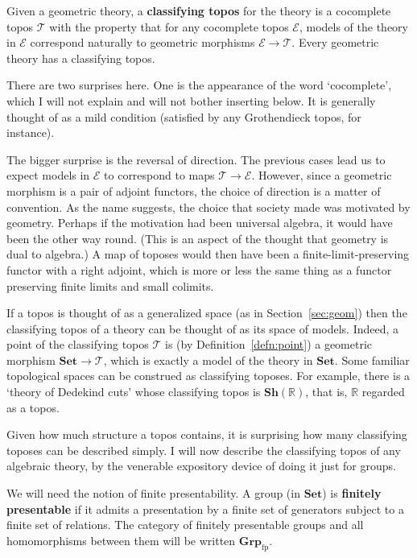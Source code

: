 \documentclass{article}
\newcommand{\cat}[1]{\mathscr{#1}}
\newcommand{\fcat}[1]{\mathbf{#1}}
\newcommand{\Set}{\fcat{Set}}
\newcommand{\reals}{\mathbb{R}}
\newcommand{\demph}[1]{\textbf{\textup{#1}}}
\newcommand{\E}{\cat{E}}
\newcommand{\T}{\cat{T}}
\newcommand{\Sh}{\fcat{Sh}}
\newcommand{\fp}{\mathrm{fp}}
\newcommand{\Gp}{\fcat{Grp}}
\begin{document}
Given a geometric theory, a \demph{classifying topos} for the theory is a
cocomplete topos $\T$ with the property that for any cocomplete topos $\E$,
models of the theory in $\E$ correspond naturally to geometric morphisms $\E
\to \T$.  Every geometric theory has a classifying topos.  

There are two surprises here.  One is the appearance of the word `cocomplete',
which I will not explain and will not bother inserting below.  It is generally
thought of as a mild condition (satisfied by any Grothendieck topos, for
instance).  

The bigger surprise is the reversal of direction.  The previous cases lead us
to expect models in $\E$ to correspond to maps $\T \to \E$.  However, since a
geometric morphism is a pair of adjoint functors, the choice of direction is a
matter of convention.  As the name suggests, the choice that society made was
motivated by geometry.  Perhaps if the motivation had been universal algebra,
it would have been the other way round.  (This is an aspect of the thought
that geometry is dual to algebra.)  A map of toposes would then have been a
finite-limit-preserving functor with a right adjoint, which is more or less
the same thing as a functor preserving finite limits and small colimits.

If a topos is thought of as a generalized space (as in Section~\ref{sec:geom})
then the classifying topos of a theory can be thought of as its space of
models.  Indeed, a point of the classifying topos $\T$ is (by
Definition~\ref{defn:point}) a geometric morphism $\Set \to \T$, which is
exactly a model of the theory in $\Set$.  Some familiar topological spaces can
be construed as classifying toposes.  For example, there is a `theory of
Dedekind cuts' whose classifying topos is $\Sh(\reals)$, that is, $\reals$
regarded as a topos.

Given how much structure a topos contains, it is surprising how many
classifying toposes can be described simply.  I will now describe the
classifying topos of any algebraic theory, by the venerable expository device
of doing it just for groups.

We will need the notion of finite presentability.  A group (in $\Set$) is
\demph{finitely presentable} if it admits a presentation by a finite set of
generators subject to a finite set of relations.  The category of finitely
presentable groups and all homomorphisms between them will be written
$\Gp_\fp$.
\end{document}
